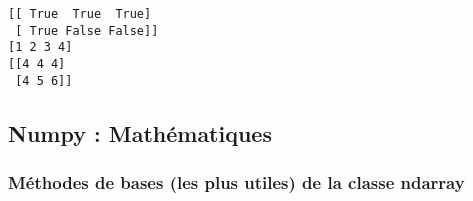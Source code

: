 \documentclass[11pt]{article}
\begin{document}
    \begin{Verbatim}[commandchars=\\\{\}]
[[ True  True  True]
 [ True False False]]
[1 2 3 4]
[[4 4 4]
 [4 5 6]]
    \end{Verbatim}

    \hypertarget{numpy-mathuxe9matiques}{%
\subsection{Numpy : Mathématiques}\label{numpy-mathuxe9matiques}}

    \hypertarget{muxe9thodes-de-bases-les-plus-utiles-de-la-classe-ndarray}{%
\subsubsection{Méthodes de bases (les plus utiles) de la classe
ndarray}\label{muxe9thodes-de-bases-les-plus-utiles-de-la-classe-ndarray}}
\end{document}
